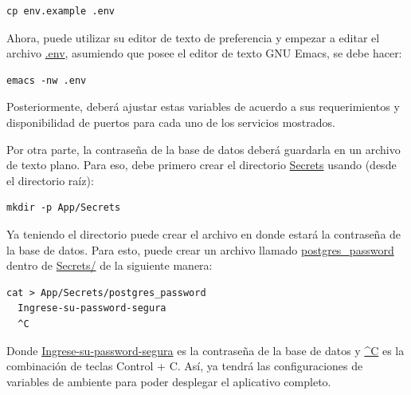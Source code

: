 \begin{lstlisting}[style=bash]
cp env.example .env
\end{lstlisting}

Ahora, puede utilizar su editor de texto de preferencia y empezar a editar el archivo \url{.env}, asumiendo que posee el editor de texto GNU Emacs, se debe hacer:

\begin{lstlisting}[style=bash]
  emacs -nw .env
\end{lstlisting}

Posteriormente, deberá ajustar estas variables de acuerdo a sus requerimientos y disponibilidad de puertos para cada uno de los servicios mostrados.

Por otra parte, la contraseña de la base de datos deberá guardarla en un archivo de texto plano. Para eso, debe primero crear el directorio \url{Secrets} usando (desde el directorio raíz):

\begin{lstlisting}[style=bash]
  mkdir -p App/Secrets
\end{lstlisting}

Ya teniendo el directorio puede crear el archivo en donde estará la contraseña de la base de datos. Para esto, puede crear un archivo llamado \url{postgres_password} dentro de \url{Secrets/} de la siguiente manera:

\begin{lstlisting}[style=bash]
  cat > App/Secrets/postgres_password
  Ingrese-su-password-segura
  ^C
\end{lstlisting}

Donde \url{Ingrese-su-password-segura} es la contraseña de la base de datos y \url{^C} es la combinación de teclas Control + C. Así, ya tendrá las configuraciones de variables de ambiente para poder desplegar el aplicativo completo. 
